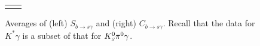 \begin{figure}[htb]
\begin{center}
\begin{tabular}{cc}
{      }
    \end{tabular}
  \end{center}
  \vspace{-0.8cm}
  \caption{
    Averages of (left) $S_{b \to s \gamma}$ and (right) $C_{b \to s \gamma}$.
    Recall that the data for $K^*\gamma$ is a subset of that for $K^0_{\scriptscriptstyle S}\pi^0\gamma$.
  }
  \label{fig:cp_uta:bsg}
\end{figure}

\begin{figure}[htb]
  \begin{center}
    \hspace{0.08\textwidth}
    \resizebox{0.33\textwidth}{!}{
}
\end{center}
\end{figure}
